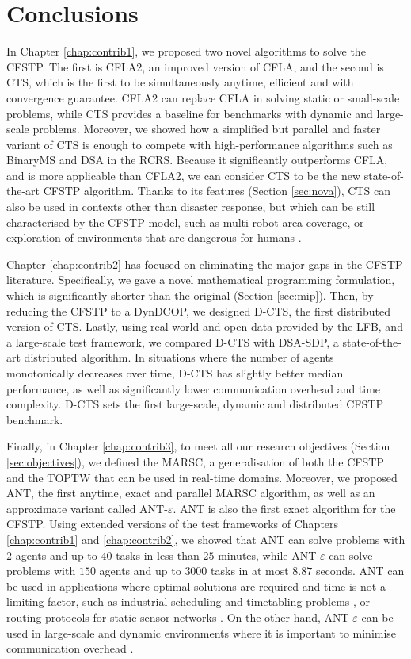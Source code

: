\chapter*{Conclusions}\label{chap:conclusions}

In Chapter \ref{chap:contrib1}, we proposed two novel algorithms to solve the CFSTP. The
first is CFLA2, an improved version of CFLA, and the second is CTS, which is the first to
be simultaneously anytime, efficient and with convergence guarantee. CFLA2 can replace
CFLA in solving static or small-scale problems, while CTS provides a baseline for
benchmarks with dynamic and large-scale problems. Moreover, we showed how a simplified but
parallel and faster variant of CTS is enough to compete with high-performance algorithms
such as BinaryMS and DSA in the RCRS. Because it significantly outperforms CFLA, and is
more applicable than CFLA2, we can consider CTS to be the new state-of-the-art CFSTP
algorithm.
Thanks to its features (Section \ref{sec:nova}), CTS can also be used in contexts other
than disaster response, but which can be still characterised by the CFSTP model, such as
multi-robot area coverage, or exploration of environments that are dangerous for humans
\cite[Section $8$]{ramchurn2010cfstp}.

Chapter \ref{chap:contrib2} has focused on eliminating the major gaps in the CFSTP
literature. Specifically, we gave a novel mathematical programming formulation, which is
significantly shorter than the original (Section \ref{sec:mip}).
Then, by reducing the CFSTP to a DynDCOP, we designed D-CTS, the first distributed version
of CTS. Lastly, using real-world and open data provided by the LFB, and a large-scale
test framework, we compared D-CTS with DSA-SDP, a state-of-the-art distributed algorithm.
In situations where the number of agents monotonically decreases over time, D-CTS has
slightly better median performance, as well as significantly lower communication overhead
and time complexity.
D-CTS sets the first large-scale, dynamic and distributed CFSTP benchmark.

Finally, in Chapter \ref{chap:contrib3}, to meet all our research objectives (Section
\ref{sec:objectives}), we defined the MARSC, a generalisation of both the CFSTP and the
TOPTW that can be used in real-time domains. Moreover, we proposed ANT, the first
anytime, exact and parallel MARSC algorithm, as well as an approximate variant called
ANT-$\varepsilon$. ANT is also the first exact algorithm for the CFSTP.
Using extended versions of the test frameworks of Chapters \ref{chap:contrib1} and
\ref{chap:contrib2}, we showed that ANT can solve problems with $2$ agents and up to $40$
tasks in less than $25$ minutes, while ANT-$\varepsilon$ can solve problems with $150$
agents and up to $3000$ tasks in at most $8.87$ seconds.
ANT can be used in applications where optimal solutions are required and time is not a
limiting factor, such as industrial scheduling and timetabling problems \cite{petcu2005},
or routing protocols for static sensor networks \cite{kho2009}.
On the other hand, ANT-$\varepsilon$ can be used in large-scale and dynamic environments
where it is important to minimise communication overhead \cite{chapman2011,ponda2015}.

